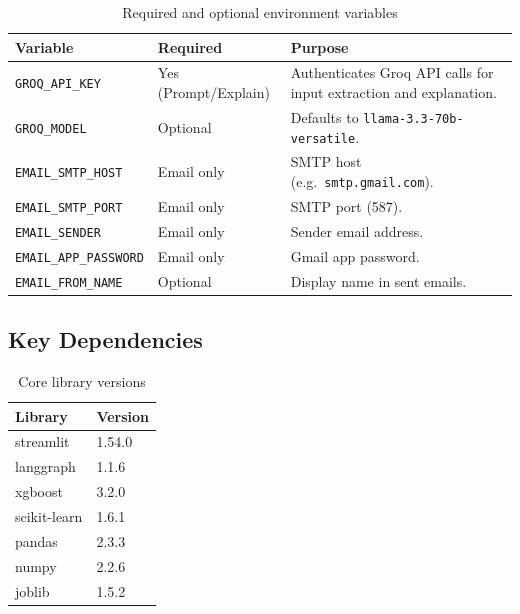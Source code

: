 \documentclass[12pt,a4paper]{article}
\begin{document}
\begin{table}[H]
\centering
\caption{Required and optional environment variables}
\renewcommand{\arraystretch}{1.25}
\begin{tabularx}{\textwidth}{p{4.8cm}p{2.4cm}X}
\toprule
\textbf{Variable} & \textbf{Required} & \textbf{Purpose} \\
\midrule
\texttt{GROQ\_API\_KEY}      & Yes (Prompt/Explain) & Authenticates Groq API calls for input extraction and explanation. \\
\texttt{GROQ\_MODEL}         & Optional             & Defaults to \texttt{llama-3.3-70b-versatile}. \\
\texttt{EMAIL\_SMTP\_HOST}   & Email only           & SMTP host (e.g.\ \texttt{smtp.gmail.com}). \\
\texttt{EMAIL\_SMTP\_PORT}   & Email only           & SMTP port (587). \\
\texttt{EMAIL\_SENDER}       & Email only           & Sender email address. \\
\texttt{EMAIL\_APP\_PASSWORD}& Email only           & Gmail app password. \\
\texttt{EMAIL\_FROM\_NAME}   & Optional             & Display name in sent emails. \\
\bottomrule
\end{tabularx}
\end{table}

\subsection{Key Dependencies}

\begin{table}[H]
\centering
\caption{Core library versions}
\renewcommand{\arraystretch}{1.2}
\begin{tabular}{ll}
\toprule
\textbf{Library} & \textbf{Version} \\
\midrule
streamlit    & 1.54.0 \\
langgraph    & 1.1.6  \\
xgboost      & 3.2.0  \\
scikit-learn & 1.6.1  \\
pandas       & 2.3.3  \\
numpy        & 2.2.6  \\
joblib       & 1.5.2  \\
\bottomrule
\end{tabular}
\end{table}

\end{document}
